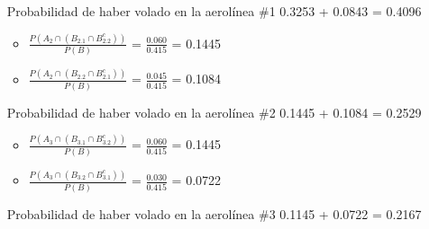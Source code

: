 \documentclass[12pt, letterpaper, spanish]{article}
\begin{document}
\begin{itemize}
\begin{itemize}
    \end{itemize}
    \item[Probabilidad] de haber volado en la aerol\'inea \#1 0.3253 + 0.0843 = 0.4096
    \begin{itemize}
        \item $\displaystyle\frac{P(A_2 \cap (B_{2.1} \cap B_{2.2}^{c}))}{P(B)}$ = $\displaystyle\frac{0.060}{0.415}$ = 0.1445
        \item $\displaystyle\frac{P(A_2 \cap (B_{2.2} \cap B_{2.1}^{c}))}{P(B)}$ = $\displaystyle\frac{0.045}{0.415}$ = 0.1084
    \end{itemize}
    \item[Probabilidad] de haber volado en la aerol\'inea \#2 0.1445 + 0.1084 = 0.2529
    \begin{itemize}
        \item $\displaystyle\frac{P(A_3 \cap (B_{3.1} \cap B_{3.2}^{c}))}{P(B)}$ = $\displaystyle\frac{0.060}{0.415}$ = 0.1445
        \item $\displaystyle\frac{P(A_3 \cap (B_{3.2} \cap B_{3.1}^{c}))}{P(B)}$ = $\displaystyle\frac{0.030}{0.415}$ = 0.0722
    \end{itemize}
    \item[Probabilidad] de haber volado en la aerol\'inea \#3 0.1145 + 0.0722 = 0.2167
\end{itemize}
\end{document}
